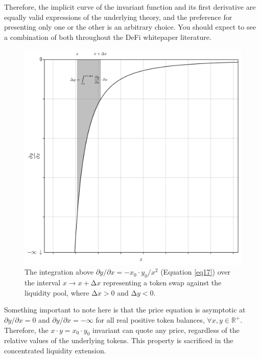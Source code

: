 \documentclass{article}
\begin{document}
Therefore, the implicit curve of the invariant function and its first derivative are equally valid expressions of the underlying theory, and the preference for presenting only one or the other is an arbitrary choice. You should expect to see a combination of both throughout the DeFi whitepaper literature. 

\begin{figure}[ht]
    \centering
    \includegraphics[width=\textwidth]{fig05.png}
    \captionsetup{
        justification=raggedright,
        singlelinecheck=false,
        font=small,
        labelfont=bf,
        labelsep=quad,
        format=plain
    }
    \caption{The integration above $\partial y / \partial x = - x_{0} \cdot y_{0} / x ^ {2}$ (Equation \ref{eq17}) over the interval $x \rightarrow x + \mathrm{\Delta}x$ representing a token swap against the liquidity pool, where $\mathrm{\Delta}x > 0$ and $\mathrm{\Delta}y < 0$.}
    \label{fig5}
\end{figure}

Something important to note here is that the price equation is asymptotic at $\partial y / \partial x = 0$ and $\partial y / \partial x = -\infty$ for all real positive token balances, $\forall x, y \in \mathbb{R} ^ {+}$. Therefore, the $x \cdot y = x_{0} \cdot y_{0}$ invariant can quote any price, regardless of the relative values of the underlying tokens. This property is sacrificed in the concentrated liquidity extension.
\end{document}
